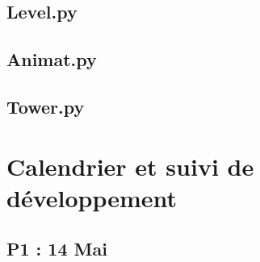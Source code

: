 \documentclass[a4paper]{article}
\begin{document}
        \subsection{Level.py}
        \noindent
            \begin{alltt}
                
            \end{alltt}

        \subsection{Animat.py}
        \noindent
            \begin{alltt}
                
            \end{alltt}


        \subsection{Tower.py}
            \begin{alltt}
                
            \end{alltt}

    \section{Calendrier et suivi de développement}
        \subsection{P1 : 14 Mai}
\end{document}

